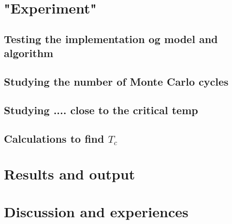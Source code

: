 \documentclass[11pt,a4wide]{article}
\begin{document}
\section{"Experiment"}
\subsection{Testing the implementation og model and algorithm}

\subsection{Studying the number of Monte Carlo cycles}


\subsection{Studying .... close to the critical temp}


\subsection{Calculations to find $T_c$}


\section{Results and output}


\section{Discussion and experiences}





\newpage
\end{document}
